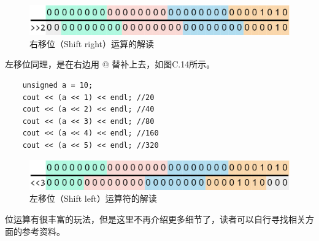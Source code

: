 \begin{figure}[htbp]
    \centering
    \includegraphics[width=.8\textwidth]{../images/other_parts/C_bitwise_right_shift.drawio.png}
    \caption{右移位（Shift right）运算的解读}
\end{figure}
左移位同理，是在右边用 @ 替补上去，如图C.14所示。
\begin{lstlisting}
    unsigned a = 10;
    cout << (a << 1) << endl; //20
    cout << (a << 2) << endl; //40
    cout << (a << 3) << endl; //80
    cout << (a << 4) << endl; //160
    cout << (a << 5) << endl; //320
\end{lstlisting}
\begin{figure}[htbp]
    \centering
    \includegraphics[width=.8\textwidth]{../images/other_parts/C_bitwise_left_shift.drawio.png}
    \caption{左移位（Shift left）运算符的解读}
\end{figure}\par
位运算有很丰富的玩法，但是这里不再介绍更多细节了，读者可以自行寻找相关方面的参考资料。\par
